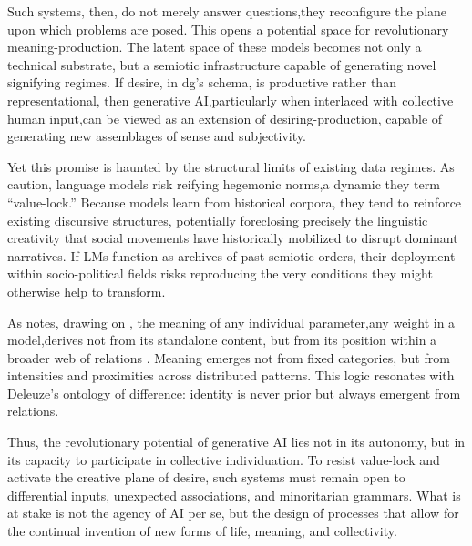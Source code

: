 Such systems, then, do not merely answer questions,they reconfigure the plane upon which problems are posed. This opens a potential space for revolutionary meaning-production. The latent space of these models becomes not only a technical substrate, but a semiotic infrastructure capable of generating novel signifying regimes. If desire, in \gls{dg}'s schema, is productive rather than representational, then generative AI,particularly when interlaced with collective human input,can be viewed as an extension of desiring-production, capable of generating new assemblages of sense and subjectivity.

Yet this promise is haunted by the structural limits of existing data regimes. As \textcite{bender2021b} caution, language models risk reifying hegemonic norms,a dynamic they term “value-lock.” Because models learn from historical corpora, they tend to reinforce existing discursive structures, potentially foreclosing precisely the linguistic creativity that social movements have historically mobilized to disrupt dominant narratives. If LMs function as archives of past semiotic orders, their deployment within socio-political fields risks reproducing the very conditions they might otherwise help to transform.

As  notes, drawing on \textcite{cilliers2002}, the meaning of any individual parameter,any weight in a model,derives not from its standalone content, but from its position within a broader web of relations \textcite{maas2023}. Meaning emerges not from fixed categories, but from intensities and proximities across distributed patterns. This logic resonates with Deleuze’s ontology of difference: identity is never prior but always emergent from relations.

Thus, the revolutionary potential of generative AI lies not in its autonomy, but in its capacity to participate in collective individuation. To resist value-lock and activate the creative plane of desire, such systems must remain open to differential inputs, unexpected associations, and minoritarian grammars. What is at stake is not the agency of AI per se, but the design of processes that allow for the continual invention of new forms of life, meaning, and collectivity.

